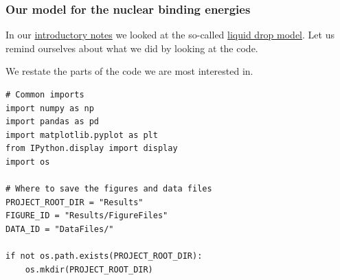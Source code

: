 \documentclass{beamer}
\begin{document}
\begin{frame}
\frametitle{Our model for the nuclear binding energies}

In our \href{{https://compphysics.github.io/MachineLearning/doc/pub/How2ReadData/html/How2ReadData.html}}{introductory notes} we looked at the so-called \href{{https://en.wikipedia.org/wiki/Semi-empirical_mass_formula}}{liquid drop model}. Let us remind ourselves about what we did by looking at the code.

We restate the parts of the code we are most interested in.






































































\begin{verbatim}
# Common imports
import numpy as np
import pandas as pd
import matplotlib.pyplot as plt
from IPython.display import display
import os

# Where to save the figures and data files
PROJECT_ROOT_DIR = "Results"
FIGURE_ID = "Results/FigureFiles"
DATA_ID = "DataFiles/"

if not os.path.exists(PROJECT_ROOT_DIR):
    os.mkdir(PROJECT_ROOT_DIR)


\end{verbatim}
\end{frame}
\end{document}

